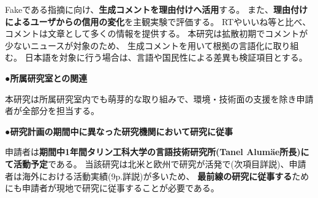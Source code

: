 {	Fakeである指摘に向け、\textbf{生成コメントを理由付けへ活用}する。
	また、\textbf{理由付けによるユーザからの信用の変化}を主観実験で評価する。
	RTやいいね等と⽐べ、コメントは⽂章として多くの情報を提供する。
	本研究は拡散初期でコメントが少ないニュースが対象のため、
	⽣成コメントを⽤いて根拠の⾔語化に取り組む。
	⽇本語を対象に⾏う場合は、⾔語や国⺠性による差異も検証項⽬とする。

	\noindent
	●\textbf{所属研究室との関連}

	本研究は所属研究室内でも萌芽的な取り組みで、環境・技術面の支援を除き申請者が全部分を担当する。

	\noindent
	●\textbf{研究計画の期間中に異なった研究機関において研究に従事}
	
	申請者は\textbf{期間中1年間タリン工科大学の言語技術研究所(Tanel Alumäe所長)にて活動予定}である。
	当該研究は北米と欧州で研究が活発で(次項目詳説)、申請者は海外における活動実績(9p.詳説)が多いため、
	\textbf{最前線の研究に従事する}ためにも申請者が現地で研究に従事することが必要である。

}

\newcommand{\人権の保護及び法令等の遵守への対応}{%
	コメント取得を予定してしているSNSはTwitterである。
	Twitter社は2020年3月より学術目的でTwitter APIの利用を自由化しているほか、
	取得したツイートIDを含む情報をデータセットとして公開することも学術目的であれば認められている\cite{twitter_2020}。

	また、先行研究が提供したデータセットを使用する場合は、提供者が示しているライセンスやポリシーを遵守する。

	なお、学習済みモデルの公表は平成30年改正著作権法第30条4号により認められている。

	ただし、本研究では主観評価実験としてSNSユーザを対象としたアンケート調査を予定している。
	この調査により収集したデータは、個⼈の特定につながる情報を匿名化した上で解析を⾏い、
	解析結果の公表に際しては、匿名化を⾏ったデータを⽤い、個⼈情報の漏洩防⽌に配慮する。

	{\footnotesize
		\begin{thebibliography}{99}
			\setcounter{enumiv}{11}
			\bibitem{twitter_2020} Twitter開発者ポリシーを分かりやすくアップデート, 2020年3月11日. (最終閲覧日 2020年4月19日) \url{https://blog.twitter.com/developer/ja_jp/topics/tools/2020/DevPolicyUpdate.html}
		\end{thebibliography}
	}
}

